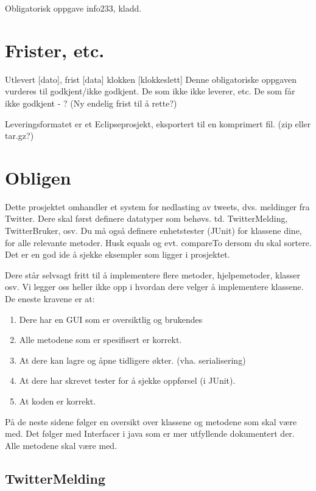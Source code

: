 \documentclass{article}
\begin{document}
Obligatorisk oppgave info233, kladd.

\section{Frister, etc.}
Utlevert [dato], frist [data] klokken [klokkeslett]
Denne obligatoriske oppgaven vurderes til godkjent/ikke godkjent.
De som ikke ikke leverer, etc.
De som får ikke godkjent - ? (Ny endelig frist til å rette?)

Leveringsformatet er et Eclipseprosjekt, eksportert til en komprimert fil. (zip eller tar.gz?)

\section{Obligen}
Dette prosjektet omhandler et system for nedlasting av tweets, dvs. meldinger fra Twitter. Dere skal først definere datatyper som behøvs. td. TwitterMelding, TwitterBruker, osv.
Du må også definere enhetstester (JUnit) for klassene dine, for alle relevante metoder. Husk equals og evt. compareTo dersom du skal sortere.
Det er en god ide å sjekke eksempler som ligger i prosjektet.

Dere står selvsagt fritt til å implementere flere metoder, hjelpemetoder, klasser osv.
Vi legger oss heller ikke opp i hvordan dere velger å implementere klassene.
De eneste kravene er at:
\begin{enumerate}
\item Dere har en GUI som er oversiktlig og brukendes
\item Alle metodene som er spesifisert er korrekt.
\item At dere kan lagre og åpne tidligere økter. (vha. serialisering)
\item At dere har skrevet tester for å sjekke oppførsel (i JUnit).
\item At koden er korrekt.
\end{enumerate}

På de neste sidene følger en oversikt over klassene og metodene som skal være med.
Det følger med Interfacer i java som er mer utfyllende dokumentert der. Alle metodene skal være med.


\newpage

\subsection{TwitterMelding}
\label{subsec:TwitterMelding}
\end{document}
